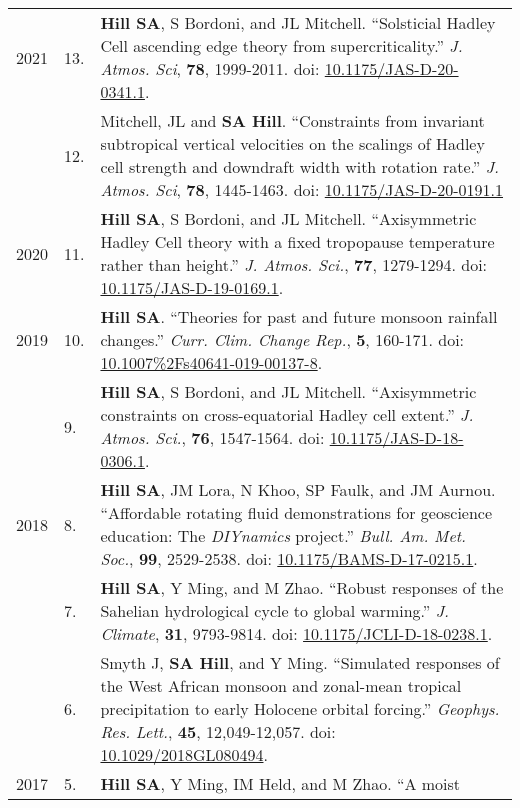 \documentclass[letterpaper,11pt]{shillcv}
\begin{document}
\begin{longtable}{@{} Y{0.05\textwidth} >{\color{black}} p{0.04\textwidth} @{} L{0.91\textwidth} @{}}
2021 & 13. & \textbf{Hill SA}, S Bordoni, and JL Mitchell.  ``Solsticial Hadley Cell ascending edge theory from supercriticality.''  \emph{J. Atmos. Sci}, \textbf{78}, 1999-2011.  doi: \href{https://doi.org/10.1175/JAS-D-20-0341.1}{10.1175/JAS-D-20-0341.1}.\\
     & 12. & Mitchell, JL and \textbf{SA Hill}.  ``Constraints from invariant
subtropical vertical velocities on the scalings of Hadley cell strength and
downdraft width with rotation rate.''  \emph{J. Atmos. Sci}, \textbf{78}, 1445-1463.  doi: \href{https://doi.org/10.1175/JAS-D-20-0191.1}{10.1175/JAS-D-20-0191.1}\\
2020 & 11. & \textbf{Hill SA}, S Bordoni, and JL Mitchell.
``Axisymmetric Hadley Cell theory with a fixed tropopause temperature rather
than height.'' \emph{J. Atmos. Sci.}, \textbf{77}, 1279-1294.  doi: \href{https://doi.org/10.1175/JAS-D-19-0169.1}{10.1175/JAS-D-19-0169.1}.\\
2019 & 10. & \textbf{Hill SA}.  ``Theories for past and future monsoon rainfall
changes.'' \emph{Curr. Clim. Change Rep.}, \textbf{5}, 160-171.  doi: \href{https://doi.org/10.1007\%2Fs40641-019-00137-8}{10.1007\%2Fs40641-019-00137-8}.\\
     & 9. & \textbf{Hill SA}, S Bordoni, and JL Mitchell.
``Axisymmetric constraints on cross-equatorial Hadley cell extent.''
\emph{J. Atmos. Sci.}, \textbf{76}, 1547-1564.  doi: \href{https://doi.org/10.1175/JAS-D-18-0306.1}{10.1175/JAS-D-18-0306.1}.\\
2018 & 8. & \textbf{Hill SA}, JM Lora, N Khoo, SP Faulk, and
JM Aurnou.  ``Affordable rotating fluid demonstrations for
geoscience education: The \emph{DIYnamics} project.''  \emph{Bull.
Am. Met. Soc.}, \textbf{99}, 2529-2538.  doi: \href{https://doi.org/10.1175/BAMS-D-17-0215.1}{10.1175/BAMS-D-17-0215.1}.\\
     & 7. & \textbf{Hill SA}, Y Ming, and M Zhao.  ``Robust responses of the
Sahelian hydrological cycle to global warming.''  \emph{J. Climate}, \textbf{31}, 9793-9814.  doi: \href{https://doi.org/10.1175/JCLI-D-18-0238.1}{10.1175/JCLI-D-18-0238.1}.\\
     & 6. & Smyth J, \textbf{SA Hill}, and Y Ming.  ``Simulated responses of
the West African monsoon and zonal-mean tropical precipitation to early
Holocene orbital forcing.''  \emph{Geophys. Res. Lett.}, \textbf{45},
12,049-12,057.  doi: \href{https://doi.org/10.1029/2018GL080494}{10.1029/2018GL080494}.\\
2017 & 5. & \textbf{Hill SA}, Y Ming, IM Held, and M Zhao.  ``A moist

\end{longtable}
\end{document}
